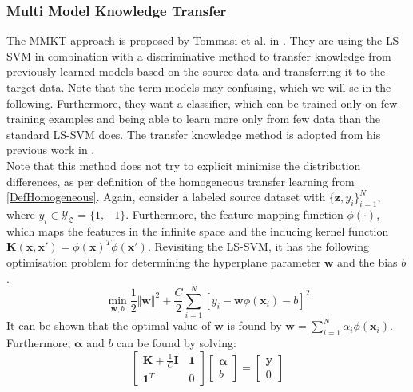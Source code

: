 \subsubsection{Multi Model Knowledge Transfer}
The \acs{MMKT} approach is proposed by Tommasi et al. in \cite{Tommasi.}.
They are using the \ac{LS-SVM} in combination with a discriminative method to transfer knowledge from previously learned models based on the source data and transferring it to the target data.
Note that the term models may confusing, which we will se in the following.
Furthermore, they want a classifier, which can be trained only on few training examples and being able to learn more only from few data than the standard \acs{LS-SVM} does.
The transfer knowledge method is adopted from his previous work in \cite{Tommasi.2009}.\\
Note that this method does not try to explicit minimise the distribution differences, as per definition of the homogeneous transfer learning from \ref{DefHomogeneous}.
Again, consider a labeled source dataset with $\{\mathbf{z},{y_i}\}_{i=1}^{N}$, where $y_i \in \mathcal{Y_Z} =\{1,-1\}$.
Furthermore, the feature mapping function $\phi(\cdot)$, which maps the features in the infinite space and the inducing kernel function $\mathbf{K}(\mathbf{x},\mathbf{x}')=\phi(\mathbf{x})^T\phi(\mathbf{x}')$.
Revisiting the \acs{LS-SVM}, it has the following optimisation problem for determining the hyperplane parameter $\mathbf{w}$ and the bias $b$.\cite{Tommasi.}
\begin{equation}\label{EqLSVMOptProblem}
	\min_{\mathbf{w},b} \frac{1}{2}\Vert\mathbf{w}\Vert^2 + \frac{C}{2}\sum_{i=1}^{N}[y_i-\mathbf{w}\phi(\mathbf{x}_i)-b]^2
\end{equation}
It can be shown  that the optimal value of $\mathbf{w}$ is found by $\mathbf{w} = \sum_{i=1}^{N}\alpha_i\phi(\mathbf{x}_i)$.
Furthermore, $\boldsymbol{\alpha}$ and $b$ can be found by solving:\cite{Tommasi.}
\begin{equation}
	\begin{bmatrix}
		\mathbf{K}+\frac{1}{C}\mathbf{I} \>\>\>\> \mathbf{1}\\
		\mathbf{1}^T \>\>\>\>\>\>\>\>\>\>\>\>\>\> 0
	\end{bmatrix}
	\begin{bmatrix}
		\boldsymbol{\alpha}\\
		b
	\end{bmatrix}
	= 
	\begin{bmatrix}
		\mathbf{y} \\
		0
	\end{bmatrix}
\end{equation}
